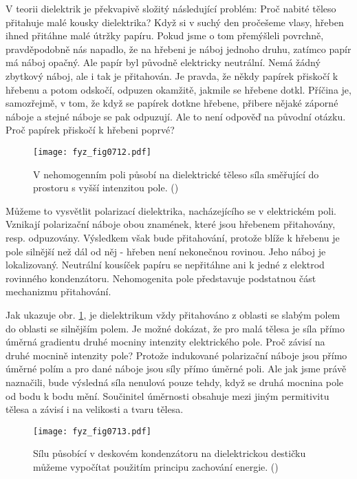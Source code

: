     V teorii dielektrik je překvapivě složitý následující problém: Proč nabité těleso přitahuje malé
    kousky dielektrika? Když si v suchý den pročešeme vlasy, hřeben ihned přitáhne malé útržky
    papíru. Pokud jsme o tom přemýšleli povrchně, pravděpodobně nás napadlo, že na hřebeni je náboj
    jednoho druhu, zatímco papír má náboj opačný. Ale papír byl původně elektricky neutrální. Nemá
    žádný zbytkový náboj, ale i tak je přitahován. Je pravda, že někdy papírek přiskočí k hřebenu a
    potom odskočí, odpuzen okamžitě, jakmile se hřebene dotkl. Příčina je, samozřejmě, v tom, že
    když se papírek dotkne hřebene, přibere nějaké záporné náboje a stejné náboje se pak odpuzují.
    Ale to není odpověď na původní otázku. Proč papírek přiskočí k hřebeni poprvé?

    \begin{figure}[ht!] %
      \centering
      \texttt{[image: fyz\_fig0712.pdf]}
      \caption{V nehomogenním poli působí na dielektrické těleso síla směřující do prostoru s vyšší
              intenzitou pole. (\cite[s.~184]{Feynman02})}
      \label{fyz:fig0712}
    \end{figure}

    Můžeme to vysvětlit polarizací dielektrika, nacházejícího se v elektrickém poli. Vznikají
    polarizační náboje obou znamének, které jsou hřebenem přitahovány, resp. odpuzovány. Výsledkem
    však bude přitahování, protože blíže k hřebenu je pole silnější než dál od něj - hřeben není
    nekonečnou rovinou. Jeho náboj je lokalizovaný. Neutrální kousíček papíru se nepřitáhne ani k
    jedné z elektrod rovinného kondenzátoru. Nehomogenita pole představuje podstatnou část
    mechanizmu přitahování.

    Jak ukazuje obr. \ref{fyz:fig0712}, je dielektrikum vždy přitahováno z oblasti se slabým polem do
    oblasti se silnějším polem. Je možné dokázat, že pro malá tělesa je síla přímo úměrná gradientu
    druhé mocniny intenzity elektrického pole. Proč závisí na druhé mocnině intenzity pole? Protože
    indukované polarizační náboje jsou přímo úměrné polím a pro dané náboje jsou síly přímo úměrné
    poli. Ale jak jsme právě naznačili, bude výsledná síla nenulová pouze tehdy, když se druhá
    mocnina pole od bodu k bodu mění. Součinitel úměrnosti obsahuje mezi jiným permitivitu tělesa a
    závisí i na velikosti a tvaru tělesa.

    \begin{figure}[ht!] %
      \centering
      \texttt{[image: fyz\_fig0713.pdf]}
      \caption{Sílu působící v deskovém kondenzátoru na dielektrickou destičku můžeme vypočítat
               použitím principu zachování energie. (\cite[s.~707]{Feynman02})}
      \label{fyz:fig0713}
    \end{figure}

